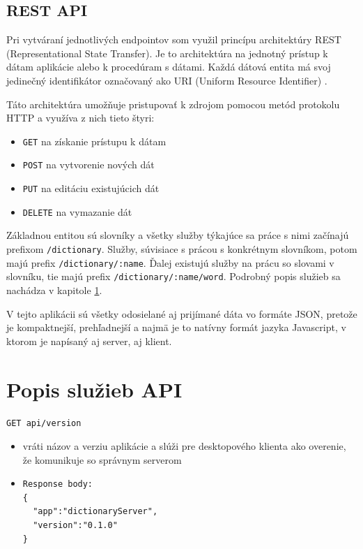\documentclass[
  digital, %
  table,   %
  lof,     %
  lot,     %
]{fithesis3}
\begin{document}
\subsection{REST API}
Pri vytváraní jednotlivých endpointov som využil princípu architektúry REST (Representational State Transfer). Je to architektúra na jednotný prístup k dátam aplikácie alebo k procedúram s dátami. Každá dátová entita má svoj jedinečný identifikátor označovaný ako URI (Uniform Resource Identifier) \parencite{masse2011rest}. 

Táto architektúra umožňuje pristupovať k zdrojom pomocou metód protokolu HTTP a využíva z nich tieto štyri:
\begin{itemize}
	\item \texttt{GET} na získanie prístupu k dátam
	\item \texttt{POST} na vytvorenie nových dát
	\item \texttt{PUT} na editáciu existujúcich dát
    \item \texttt{DELETE} na vymazanie dát
\end{itemize}

Základnou entitou sú slovníky a všetky služby týkajúce sa práce s nimi začínajú prefixom \texttt{/dictionary}. Služby, súvisiace s prácou s konkrétnym slovníkom, potom majú prefix \texttt{/dictionary/:name}. Ďalej existujú služby na prácu so slovami v slovníku, tie majú prefix \texttt{/dictionary/:name/word}. Podrobný popis služieb sa nachádza v kapitole \ref{sec:api}.

V tejto aplikácii sú všetky odosielané aj prijímané dáta vo formáte JSON, pretože je kompaktnejší, prehľadnejší a najmä je to natívny formát jazyka Javascript, v ktorom je napísaný aj server, aj klient.


\section{Popis služieb API} \label{sec:api}

\texttt{GET api/version}
\begin{itemize}
\item vráti názov a verziu aplikácie a slúži pre desktopového klienta ako overenie, že komunikuje so správnym serverom
\item \begin{lstlisting}[basicstyle=\small]
Response body:
{
  "app":"dictionaryServer",
  "version":"0.1.0"
}
\end{lstlisting}
\end{itemize}
\end{document}
